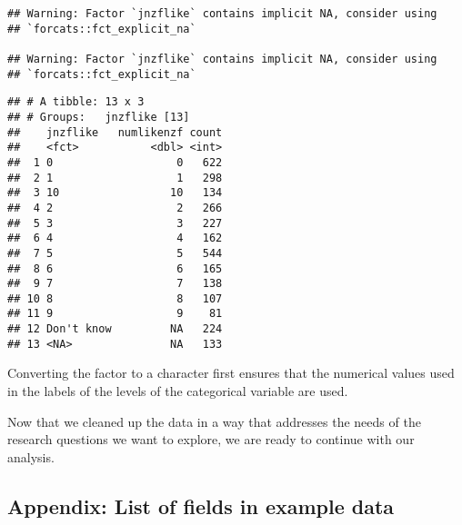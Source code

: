 \documentclass[]{article}
\begin{document}
\begin{verbatim}
## Warning: Factor `jnzflike` contains implicit NA, consider using
## `forcats::fct_explicit_na`

## Warning: Factor `jnzflike` contains implicit NA, consider using
## `forcats::fct_explicit_na`
\end{verbatim}

\begin{verbatim}
## # A tibble: 13 x 3
## # Groups:   jnzflike [13]
##    jnzflike   numlikenzf count
##    <fct>           <dbl> <int>
##  1 0                   0   622
##  2 1                   1   298
##  3 10                 10   134
##  4 2                   2   266
##  5 3                   3   227
##  6 4                   4   162
##  7 5                   5   544
##  8 6                   6   165
##  9 7                   7   138
## 10 8                   8   107
## 11 9                   9    81
## 12 Don't know         NA   224
## 13 <NA>               NA   133
\end{verbatim}

Converting the factor to a character first ensures that the numerical
values used in the labels of the levels of the categorical variable are
used.

Now that we cleaned up the data in a way that addresses the needs of the
research questions we want to explore, we are ready to continue with our
analysis.

\subsection{Appendix: List of fields in example
data}\label{appendix-list-of-fields-in-example-data}
\end{document}
